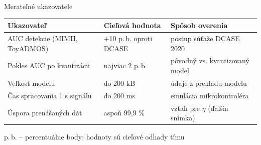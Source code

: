 \documentclass[aspectratio=169,11pt]{beamer}
\newcommand{\zdroj}[1]{\par\vfill\hfill{\scriptsize\color{seText!65}#1}}
\begin{document}
\begin{frame}{Merateľné ukazovatele}
  \begin{tabularx}{\textwidth}{@{}>{\raggedright\arraybackslash}X l >{\raggedright\arraybackslash}X@{}}
    \toprule
    \textbf{Ukazovateľ} & \textbf{Cieľová hodnota} & \textbf{Spôsob overenia} \\
    \midrule
    AUC detekcie (MIMII, ToyADMOS) & \alert{+10 p.\,b.} oproti DCASE & postup súťaže DCASE 2020 \\
    Pokles AUC po kvantizácii & \alert{najviac 2 p.\,b.} & pôvodný vs. kvantizovaný model \\
    Veľkosť modelu & \alert{do 200 kB} & údaje z prekladu modelu \\
    Čas spracovania 1 s signálu & \alert{do 200 ms} & emulácia mikrokontroléra \\
    Úspora prenášaných dát & \alert{aspoň 99,9 \%} & vzťah pre $\eta$ (ďalšia snímka) \\
    \bottomrule
  \end{tabularx}
  \zdroj{p.\,b. -- percentuálne body; hodnoty sú cieľové odhady tímu}
\end{frame}
\end{document}
